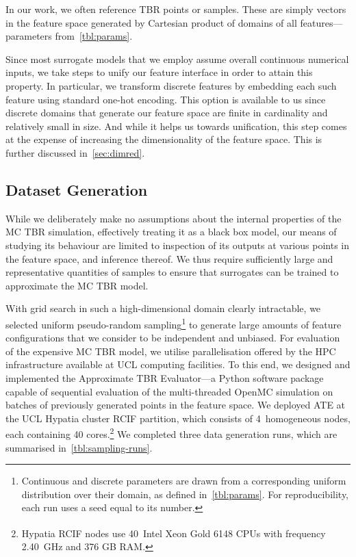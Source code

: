 In our work, we often reference TBR points or samples. These are simply vectors
in the feature space generated by Cartesian product of domains of all
features---parameters from~\cref{tbl:params}.

Since most surrogate models
that we employ assume overall continuous numerical inputs, we take steps to unify our
feature interface in order to attain this property. In particular, we transform
discrete features by embedding each such feature using standard one-hot
encoding. This option is available to
us since discrete domains that generate our feature space are finite in
cardinality and relatively small in size. And while it helps us towards
unification, this step comes at the expense of increasing the dimensionality of the
feature space. This is further discussed in~\cref{sec:dimred}.


\subsection{Dataset Generation}
\label{sec:dataset-generation}

While we deliberately make no assumptions about the internal properties of the
MC TBR simulation, effectively treating it as a black box model, our means of
studying its behaviour are limited to inspection of its outputs at various
points in the feature space, and inference thereof. We thus require
sufficiently large and representative quantities of samples to ensure that
surrogates can be trained to approximate the MC TBR model.

With grid search in such a high-dimensional domain clearly intractable, we
selected uniform pseudo-random sampling\footnote{Continuous and discrete
parameters are drawn from a corresponding uniform distribution over their
domain, as defined in~\cref{tbl:params}. For reproducibility, each run uses a seed equal to its number.} to generate large amounts of feature
configurations that we consider to be independent and unbiased. For evaluation
of the expensive MC TBR model, we utilise parallelisation offered by
the HPC infrastructure available at UCL computing facilities. To this end, we
designed and implemented the Approximate TBR Evaluator---a Python software package capable of
sequential evaluation of the multi-threaded OpenMC simulation on batches of
previously generated points in the feature space.
We deployed ATE at the UCL Hypatia cluster RCIF partition, which consists of
4~homogeneous nodes, each containing 40 cores.\footnote{Hypatia RCIF nodes use
40~Intel\textsuperscript{\textregistered} Xeon\textsuperscript{\textregistered}
Gold 6148 CPUs with frequency 2.40~GHz and 376 GB RAM.} We completed three data
generation runs, which are summarised in~\cref{tbl:sampling-runs}.

